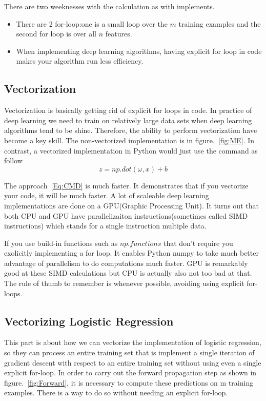 \documentclass[a4paper]{article}
\begin{document}
There are two weeknesses with the calculation as with implements.
\begin{itemize}
\item There are 2 for-loop:one is a small loop over the $m$ training examples and the second for loop is  over all $n$ features.
\item When implementing deep learning algorithms, having explicit for loop in code makes your algorithm run less efficiency.
\end{itemize} 


\subsection{Vectorization}
Vectorization is basically getting rid of explicit for loops in code. In practice of deep learning we need to train on relatively large data sets when deep learning algorithms tend to be shine. Therefore, the ability to perform vectorization have become a key skill. The non-vectorized implementation is in figure.~\ref{fig:ME}. In contrast, a vectorized implementation in Python would just use the command as follow
\begin{equation}
z=np.dot(\omega,x)+b
\label{Eq:CMD}
\end{equation}\par
The approach~\ref{Eq:CMD} is much faster. It demonstrates that if you vectorize your code, it will be much faster. A lot of scaleable deep learning implementations are done on a GPU(Graphic Processing Unit). It turns out that both CPU and GPU have parallelizaiton instructions(sometimes called SIMD instructions) which stands for a single instruction multiple data.\par
If you use build-in functions such as $np.functions$ that don't require you exolicitly implementing a for loop. It enables Python numpy to take much better advantage of parallelism to do computations much faster. GPU is remarkably good at these SIMD calculations  but CPU is actually also not too bad at that. The rule of thumb to remember is whenever possible, avoiding using explicit for-loops.\par


\subsection{Vectorizing Logistic Regression}
This part is about how we can vectorize the implementation of logistic regression, so they can process an entire training set that is implement a single iteration of gradient descent with respect to an entire training set without using even a single explicit for-loop. In order to carry out the forward propagation step as shown in figure.~\ref{fig:Forward}, it is necessary to compute these predictions on m training examples. There is a way to do so without needing an explicit for-loop.\par
\end{document}
